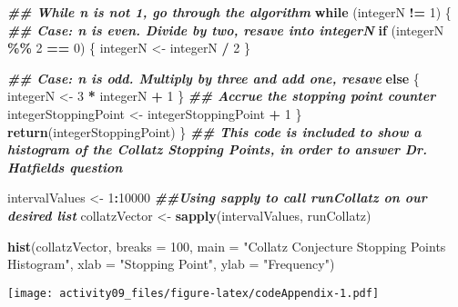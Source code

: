 \documentclass[
]{article}
\newenvironment{Shaded}{\begin{snugshade}}{\end{snugshade}}
\newcommand{\AttributeTok}[1]{\textcolor[rgb]{0.13,0.29,0.53}{#1}}
\newcommand{\ControlFlowTok}[1]{\textcolor[rgb]{0.13,0.29,0.53}{\textbf{#1}}}
\newcommand{\DecValTok}[1]{\textcolor[rgb]{0.00,0.00,0.81}{#1}}
\newcommand{\DocumentationTok}[1]{\textcolor[rgb]{0.56,0.35,0.01}{\textbf{\textit{#1}}}}
\newcommand{\FunctionTok}[1]{\textcolor[rgb]{0.13,0.29,0.53}{\textbf{#1}}}
\newcommand{\NormalTok}[1]{#1}
\newcommand{\OtherTok}[1]{\textcolor[rgb]{0.56,0.35,0.01}{#1}}
\newcommand{\SpecialCharTok}[1]{\textcolor[rgb]{0.81,0.36,0.00}{\textbf{#1}}}
\newcommand{\StringTok}[1]{\textcolor[rgb]{0.31,0.60,0.02}{#1}}
\begin{document}
\begin{Shaded}
\begin{Highlighting}[]
  
\DocumentationTok{\#\# While n is not 1, go through the algorithm}
  \ControlFlowTok{while}\NormalTok{ (integerN }\SpecialCharTok{!=} \DecValTok{1}\NormalTok{)                                  }
\NormalTok{    \{}
\DocumentationTok{\#\# Case: n is even. Divide by two, resave into integerN}
      \ControlFlowTok{if}\NormalTok{ (integerN }\SpecialCharTok{\%\%} \DecValTok{2} \SpecialCharTok{==} \DecValTok{0}\NormalTok{)                             }
\NormalTok{      \{}
\NormalTok{        integerN }\OtherTok{\textless{}{-}}\NormalTok{ integerN }\SpecialCharTok{/} \DecValTok{2}
\NormalTok{      \}}
    
\DocumentationTok{\#\# Case: n is odd. Multiply by three and add one, resave}
      \ControlFlowTok{else}                                                
\NormalTok{      \{}
\NormalTok{        integerN }\OtherTok{\textless{}{-}} \DecValTok{3} \SpecialCharTok{*}\NormalTok{ integerN }\SpecialCharTok{+} \DecValTok{1}
\NormalTok{      \}}
\DocumentationTok{\#\# Accrue the stopping point counter}
\NormalTok{    integerStoppingPoint }\OtherTok{\textless{}{-}}\NormalTok{ integerStoppingPoint }\SpecialCharTok{+} \DecValTok{1}      
\NormalTok{    \}}
  \FunctionTok{return}\NormalTok{(integerStoppingPoint)}
\NormalTok{\}}
\DocumentationTok{\#\# This code is included to show a histogram of the Collatz Stopping Points, in order to answer Dr. Hatfield\textquotesingle{}s question}

\NormalTok{intervalValues }\OtherTok{\textless{}{-}} \DecValTok{1}\SpecialCharTok{:}\DecValTok{10000}
\DocumentationTok{\#\#Using sapply to call runCollatz on our desired list}
\NormalTok{collatzVector }\OtherTok{\textless{}{-}} \FunctionTok{sapply}\NormalTok{(intervalValues, runCollatz)}

\FunctionTok{hist}\NormalTok{(collatzVector, }\AttributeTok{breaks =} \DecValTok{100}\NormalTok{, }\AttributeTok{main =} \StringTok{"Collatz Conjecture Stopping Points Histogram"}\NormalTok{, }\AttributeTok{xlab =} \StringTok{"Stopping Point"}\NormalTok{, }\AttributeTok{ylab =} \StringTok{"Frequency"}\NormalTok{)}
\end{Highlighting}
\end{Shaded}

\texttt{[image: activity09\_files/figure-latex/codeAppendix-1.pdf]}
\end{document}
